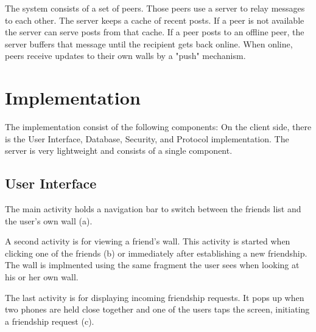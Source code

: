\documentclass{report}
\begin{document}
The system consists of a set of peers. Those peers use a server to relay messages to each other. The server keeps a cache of recent posts. If a peer is not available the server can serve posts from that cache. If a peer posts to an offline peer, the server buffers that message until the recipient gets back online. When online, peers receive 
updates to their own walls by a "push" mechanism.

\section{Implementation}

The implementation consist of the following components: On the client side, there is the User Interface, Database, Security, and Protocol implementation. The server is very lightweight and consists of a single component.

\subsection{User Interface}

The main activity holds a navigation bar to switch between the friends list and the user's own wall (a).

A second activity is for viewing a friend's wall. This activity is started when clicking one of the friends (b) or immediately after establishing a new friendship. The wall is implmented using the same fragment the user sees when looking at his or her own wall.\newline

The last activity is for displaying incoming friendship requests. It pops up when two phones are held close together and one of the users taps the screen, initiating a friendship request (c).
\end{document}
